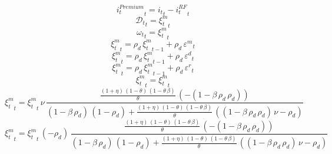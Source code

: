 \begin{dmath}
{i^{Premium}_t}_{t}={i_t}_{t}-{i^{RF}_t}_{t}
\end{dmath}
\begin{dmath}
{\mathcal{D}_t}_{t}={\xi^m_t}_{t}
\end{dmath}
\begin{dmath}
{\omega_t}_{t}={\xi^m_t}_{t}
\end{dmath}
\begin{dmath}
{\xi^m_t}_{t}={\rho_d}\, {\xi^m_t}_{t-1}+{\rho_d}\, {{\varepsilon^{m}}}_{t}
\end{dmath}
\begin{dmath}
{\xi^m_t}_{t}={\rho_d}\, {\xi^m_t}_{t-1}+{\rho_d}\, {{\varepsilon^{d}}}_{t}
\end{dmath}
\begin{dmath}
{\xi^m_t}_{t}={\rho_d}\, {\xi^m_t}_{t-1}+{\rho_d}\, {{\varepsilon^{r}}}_{t}
\end{dmath}
\begin{dmath}
{\xi^m_t}_{t}={\xi^m_t}_{t}
\end{dmath}
\begin{dmath}
{\xi^m_t}_{t}={\xi^m_t}_{t}\, {\nu}\, \frac{\frac{\left(1+{\eta}\right)\, \left(1-{\theta}\right)\, \left(1-{\theta}\, {\beta}\right)}{{\theta}}\, \left(-\left(1-{\beta}\, {\rho_d}\, {\rho_d}\right)\right)}{\left(1-{\beta}\, {\rho_d}\right)\, \left(1-{\rho_d}\right)+\frac{\left(1+{\eta}\right)\, \left(1-{\theta}\right)\, \left(1-{\theta}\, {\beta}\right)}{{\theta}}\, \left(\left(1-{\beta}\, {\rho_d}\, {\rho_d}\right)\, {\nu}-{\rho_d}\right)}
\end{dmath}
\begin{dmath}
{\xi^m_t}_{t}={\xi^m_t}_{t}\, \left(-{\rho_d}\right)\, \frac{\frac{\left(1+{\eta}\right)\, \left(1-{\theta}\right)\, \left(1-{\theta}\, {\beta}\right)}{{\theta}}\, \left(-\left(1-{\beta}\, {\rho_d}\, {\rho_d}\right)\right)}{\left(1-{\beta}\, {\rho_d}\right)\, \left(1-{\rho_d}\right)+\frac{\left(1+{\eta}\right)\, \left(1-{\theta}\right)\, \left(1-{\theta}\, {\beta}\right)}{{\theta}}\, \left(\left(1-{\beta}\, {\rho_d}\, {\rho_d}\right)\, {\nu}-{\rho_d}\right)}
\end{dmath}
